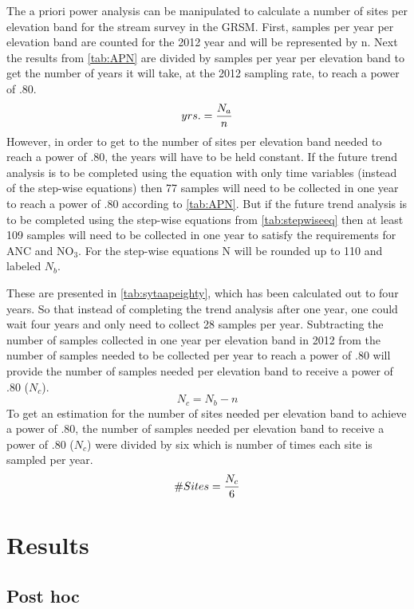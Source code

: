 The a priori power analysis can be manipulated to calculate a number of sites per elevation band for the stream survey in the GRSM.
First, samples per year per elevation band are counted for the 2012 year and will be represented by n.
Next the results from \autoref{tab:APN} are divided by samples per year per elevation band to get the number of years it will take, at the 2012 sampling rate, to reach a power of .80.
\begin{equation} \label{eq:yrs}
    yrs. = {N_a \over n}
\end{equation}
However, in order to get to the number of sites per elevation band needed to reach a power of .80, the years will have to be held constant.
If the future trend analysis is to be completed using the equation with only time variables (instead of the step-wise equations) then 77 samples will need to be collected in one year to reach a power of .80 according to \autoref{tab:APN}.
But if the future trend analysis is to be completed using the step-wise equations from \autoref{tab:stepwiseeq} then at least 109 samples will need to be collected in one year to satisfy the requirements for ANC and NO$_3$.
For the step-wise equations N will be rounded up to 110 and labeled $N_b$.

These are presented in \autoref{tab:sytaapeighty}, which has been calculated out to four years.
So that instead of completing the trend analysis after one year, one could wait four years and only need to collect 28 samples per year.
Subtracting the number of samples collected in one year per elevation band in 2012 from the number of samples needed to be collected per year to reach a power of .80 will provide the number of samples needed per elevation band to receive a power of .80 ($N_c$).
\begin{equation} \label{eq:Nc}
    N_c={N_b - n}
\end{equation}
To get an estimation for the number of sites needed per elevation band to achieve a power of .80, the number of samples needed per elevation band to receive a power of .80 ($N_c$) were divided by six which is number of times each site is sampled per year.
\begin{equation}\label{eq:sites}
    \#Sites = {N_c \over 6}
\end{equation}

\section{Results}

\subsection{Post hoc}

